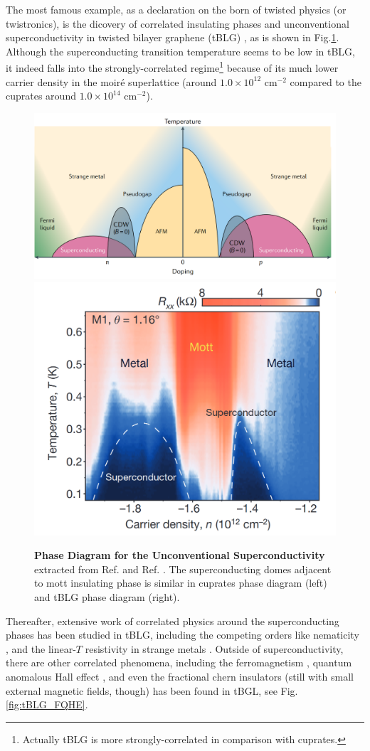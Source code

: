 The most famous example, as a declaration on the born of twisted physics (or twistronics), is the dicovery of correlated insulating phases and unconventional superconductivity in twisted bilayer graphene (tBLG) \cite{cao2018correlated,cao2018unconventional}, as is shown in Fig.\ref{fig:tBLG_SC_Cao}. Although the superconducting transition temperature seems to be low in tBLG, it indeed falls into the strongly-correlated regime\footnote{Actually tBLG is more strongly-correlated in comparison with cuprates.} because of its much lower carrier density in the moir\'e superlattice (around $1.0\times 10^{12}$ cm$^{-2}$ compared to the cuprates around $1.0\times10^{14}$ cm$^{-2}$).
\begin{figure}[!htp]
    \centering
    \includegraphics[height=0.32\textwidth]{figures/Introduction/high_Tc_SC_phase_diagram.png}
    \hspace{1em}
    \includegraphics[height=0.32\textwidth]{figures/Introduction/tBLG_SC_Cao_new.png}
    \caption{\textbf{Phase Diagram for the Unconventional Superconductivity} extracted from Ref. \cite{zhou2021high} and Ref. \cite{cao2018unconventional}. The superconducting domes adjacent to mott insulating phase is similar in cuprates phase diagram (left) and tBLG phase diagram (right).}
    \label{fig:tBLG_SC_Cao}
\end{figure}
Thereafter, extensive work of correlated physics around the superconducting phases has been studied in tBLG, including the competing orders like nematicity \cite{cao2021nematicity}, and the linear-$T$ resistivity in strange metals \cite{cao2020strange}. Outside of superconductivity, there are other correlated phenomena, including the ferromagnetism \cite{sharpe2019emergent}, quantum anomalous Hall effect \cite{serlin2020intrinsic}, and even the fractional chern insulators \cite{xie2021fractional} (still with small external magnetic fields, though) has been found in tBGL, see Fig.\ref{fig:tBLG_FQHE}.
